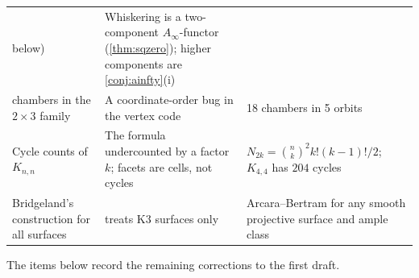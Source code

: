 \documentclass[11pt]{article}
\theoremstyle{definition}
\theoremstyle{remark}
\begin{document}
\begin{table}[ht]
\begin{tabular}{@{}R{0.2\textwidth}R{0.36\textwidth}R{0.38\textwidth}@{}}
below) & Whiskering is a two-component $A_\infty$-functor (\cref{thm:sqzero}); higher components are
\cref{conj:ainfty}(i)\\ chambers in the $2\times3$ family & A coordinate-order bug in the vertex code & 18 chambers in 5 orbits
\cite[Thm.~3.1]{Awasthi-Family}\\\addlinespace[3pt]
Cycle counts of $K_{n,n}$ & The formula undercounted by a factor $k$; facets are cells, not cycles &
$N_{2k}=\binom nk^2k!(k-1)!/2$; $K_{4,4}$ has $204$ cycles \cite[App.~A]{Awasthi-Family}\\\addlinespace[3pt]
Bridgeland's construction for all surfaces & \cite{Bridgeland2008} treats K3 surfaces only & Arcara--Bertram
\cite{ArcaraBertram2013} for any smooth projective surface and ample class\\
\bottomrule
\end{tabular}
\end{table}

The items below record the remaining corrections to the first draft.
\end{document}
